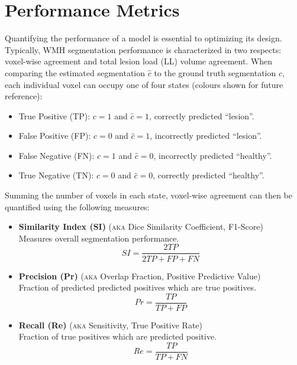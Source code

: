 \section{Performance Metrics}\label{ss:metrics}
Quantifying the performance of a model is essential to optimizing its design.
Typically, WMH segmentation performance is characterized in two respects: voxel-wise agreement and total lesion load (LL) volume agreement.
When comparing the estimated segmentation $\hat{c}$ to the ground truth segmentation $c$, each individual voxel can occupy one of four states (colours shown for future reference):
\begin{itemize}[itemsep=0pt,topsep=0pt]
  \item[\textcolor{green}{\scalebox{0.7}{$\blacksquare$}}] True Positive (TP): $c = 1$ and $\hat{c} = 1$, correctly predicted ``lesion''.
  \item[\textcolor{red}  {\scalebox{0.7}{$\blacksquare$}}] False Positive (FP): $c = 0$ and $\hat{c} = 1$, incorrectly predicted ``lesion''.
  \item[\textcolor{blue} {\scalebox{0.7}{$\blacksquare$}}] False Negative (FN): $c = 1$ and $\hat{c} = 0$, incorrectly predicted ``healthy''.
  \item[\textcolor{black}{\scalebox{0.7}{$\blacksquare$}}] True Negative (TN): $c = 0$ and $\hat{c} = 0$, correctly predicted ``healthy''.
\end{itemize}
Summing the number of voxels in each state, voxel-wise agreement can then be quantified using the following measures:
\begin{itemize}
  \item \textbf{Similarity Index (SI)}
  (\textsc{aka} Dice Similarity Coefficient, F1-Score)\\
  Measures overall segmentation performance.
  \begin{equation}SI = \dfrac{2TP}{2TP + FP + FN}\end{equation}
  \item \textbf{Precision (Pr)}
  (\textsc{aka} Overlap Fraction, Positive Predictive Value)\\
  Fraction of predicted predicted positives which are true positives.
  \begin{equation}Pr = \dfrac{TP}{TP+FP}\end{equation}
  \item \textbf{Recall (Re)}
  (\textsc{aka} Sensitivity, True Positive Rate)\\
  Fraction of true positives which are predicted positive.
  \begin{equation}Re = \dfrac{TP}{TP+FN}\end{equation}
\end{itemize}
